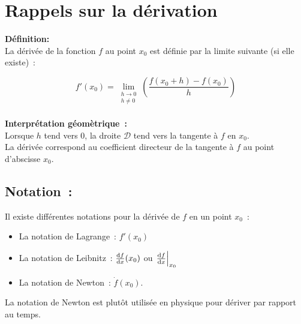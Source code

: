 \chapter{Rappels sur la dérivation}

\begin{minipage}{0.5\textwidth}

\end{minipage}
\begin{minipage}{0.5\textwidth}

\textbf{Définition:} \\

La dérivée de la fonction $f$ au point $x_0$ est définie par la limite suivante (si elle existe)~:

$$f'(x_0) = \lim\limits_{\substack{h \rightarrow 0 \\ h \neq 0}} \left( \dfrac{ f(x_0+h) - f(x_0) }{h} \right) $$ \\

\textbf{Interprétation géomètrique~:}\\

Lorsque $h$ tend vers $0$, la droite $\mathcal{D}$ tend vers la tangente à $f$ en $x_0$. \\

La dérivée correspond au coefficient directeur de la tangente à $f$ au point d'abscisse $x_0$.

\end{minipage}

\section*{Notation~:}

Il existe différentes notations pour la dérivée de $f$ en un point $x_0$~: \\

\begin{itemize}
\item La notation de Lagrange~: $f'(x_0)$ \\

\item La notation de Leibnitz~: $\odv{f}{x}(x_0)$ ou $\odv{f}{x}_{x_0}$  \\

\item La notation de Newton~: $\dot{f}(x_0)$. \\
\end{itemize}

La notation de Newton est plutôt utilisée en physique pour dériver par rapport au temps.\\

